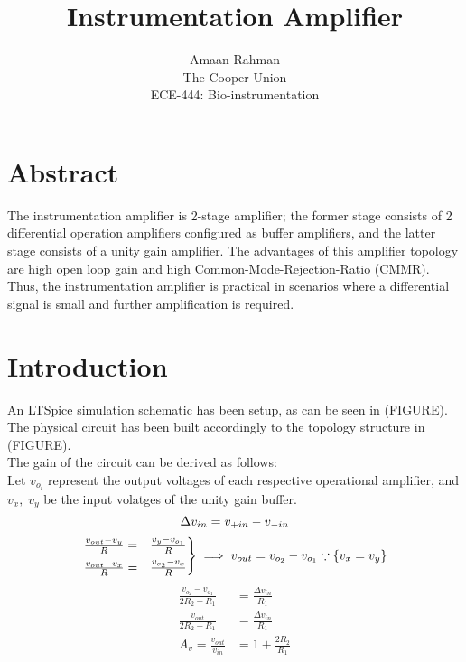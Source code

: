 \documentclass{article}
\title{Instrumentation Amplifier}
\author{Amaan Rahman \\
The Cooper Union \\
ECE-444: Bio-instrumentation}
\begin{document}
\maketitle
\section{Abstract}
The instrumentation amplifier is 2-stage amplifier; the former stage consists of 2 differential operation amplifiers configured as buffer amplifiers, and the latter stage consists of a unity gain amplifier. The advantages of this amplifier topology are high open loop gain and high Common-Mode-Rejection-Ratio (CMMR). Thus, the instrumentation amplifier is practical in scenarios where a differential signal is small and further amplification is required. 

\section{Introduction}
An LTSpice simulation schematic has been setup, as can be seen in (FIGURE). The physical circuit has been built accordingly to the topology structure in (FIGURE). \\

The gain of the circuit can be derived as follows: \\
\hspace*{1cm}Let $v_{o_i}$ represent the output voltages of each respective operational amplifier, and $v_x,\;v_y$ be the input volatges of the unity gain buffer. \\
\begin{equation*}
        \Delta v_{in} = v_{+in} - v_{-in} \\
\end{equation*}
\[
    \begin{rcases}
        \frac{v_{out} - v_y}{R} =& \frac{v_y - v_{o_1}}{R} \\
        \frac{v_{out} - v_x}{R} =& \frac{v_{o_2} - v_x}{R}
    \end{rcases} \implies v_{out} = v_{o_2} - v_{o_1} \because \{v_x = v_y\}
\]
\begin{equation*}
    \begin{aligned}
        \frac{v_{o_2} - v_{o_1}}{2R_2 + R_1} &= \frac{\Delta v_{in}}{R_1} \\
        \frac{v_{out}}{2R_2 + R_1} &= \frac{\Delta v_{in}}{R_1} \\
        A_v = \frac{v_{out}}{v_{in}} &= 1 + \frac{2R_2}{R_1}
    \end{aligned}
\end{equation*}
\vfill
\end{document}
